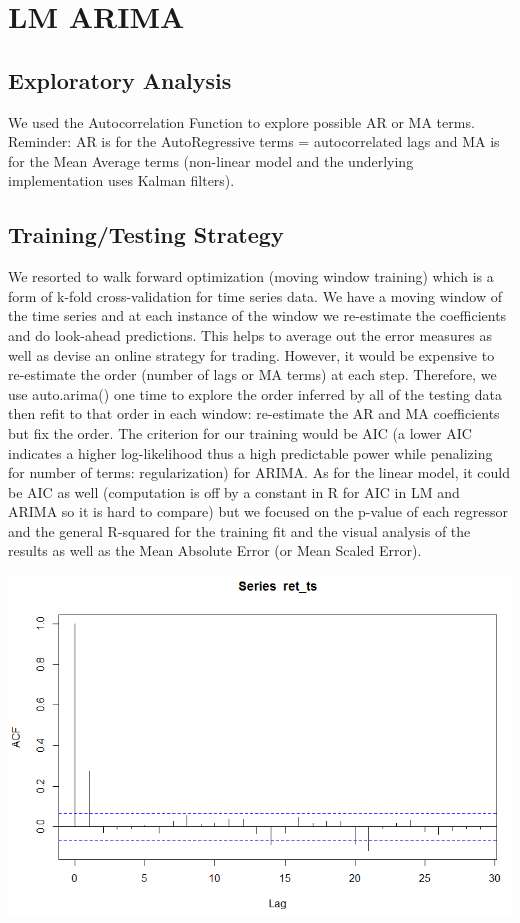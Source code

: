 \documentclass{article}
\begin{document}
	\section{LM ARIMA}


		\subsection{Exploratory Analysis}
		We used the Autocorrelation Function to explore possible AR or MA terms. Reminder: AR is for the AutoRegressive terms = autocorrelated lags and MA is for the Mean Average terms (non-linear model and the underlying implementation uses Kalman filters).
	
		\subsection{Training/Testing Strategy}
	We resorted to walk forward optimization (moving window training) which is a form of k-fold cross-validation for time series data. We have a moving window of the time series and at each instance of the window we re-estimate the coefficients and do look-ahead predictions. This helps to average out the error measures as well as devise an online strategy for trading.
	However, it would be expensive to re-estimate the order (number of lags or MA terms) at each step. Therefore, we use auto.arima() one time to explore the order inferred by all of the testing data then refit to that order in each window: re-estimate the AR and MA coefficients but fix the order. 
	The criterion for our training would be AIC (a lower AIC indicates a higher log-likelihood thus a high predictable power while penalizing for number of terms: regularization) for ARIMA. As for the linear model, it could be AIC as well (computation is off by a constant in R for AIC in LM and ARIMA so it is hard to compare) but we focused on the p-value of each regressor and the general R-squared for the training fit and the visual analysis of the results as well as the Mean Absolute Error (or Mean Scaled Error).
	
\begin{center}	\includegraphics[scale=0.7]{../ACF.PNG}\end{center}
\end{document}
